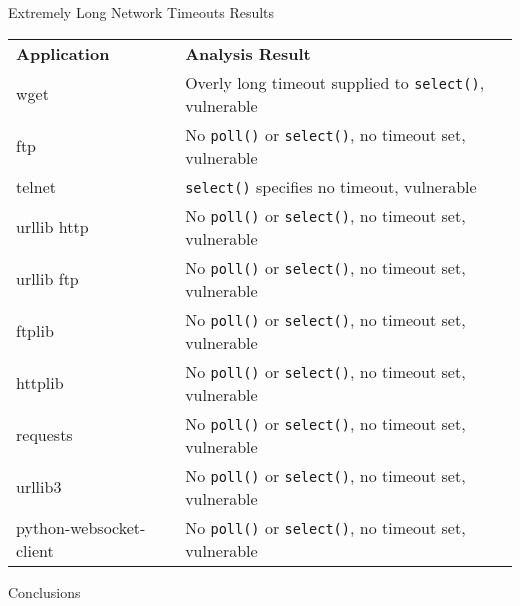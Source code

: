 \documentclass[pdf]{beamer}
\begin{document}
\begin{frame}{Extremely Long Network Timeouts Results}
  \tiny{}
  \begin{tabular}{l | l}
    {\bf Application}              & {\bf Analysis Result}\\
    wget                     & Overly long timeout supplied to {\tt select()}, vulnerable\\
    ftp                      & No {\tt poll()} or {\tt select()}, no timeout set, vulnerable\\
    telnet                   & {\tt select()} specifies no timeout, vulnerable\\
    urllib http              & No {\tt poll()} or {\tt select()}, no timeout set, vulnerable\\
    urllib ftp               & No {\tt poll()} or {\tt select()}, no timeout set, vulnerable\\
    ftplib                   & No {\tt poll()} or {\tt select()}, no timeout set, vulnerable\\
    httplib                  & No {\tt poll()} or {\tt select()}, no timeout set, vulnerable\\
    requests                 & No {\tt poll()} or {\tt select()}, no timeout set, vulnerable\\
    urllib3                  & No {\tt poll()} or {\tt select()}, no timeout set, vulnerable\\
    python-websocket-client  & No {\tt poll()} or {\tt select()}, no timeout set, vulnerable\\
  \end{tabular}
\end{frame}


\begin{frame}{Conclusions}
\end{frame}
     
\end{document}
